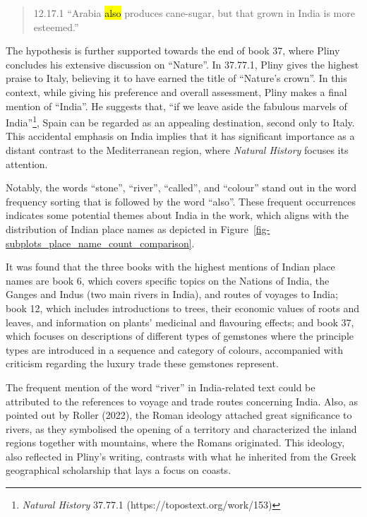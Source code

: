 \documentclass[
  12pt,
]{article}
\begin{document}
\begin{quote}
12.17.1 ``Arabia \hl{also} produces cane-sugar, but that grown in India
is more esteemed.''
\end{quote}

The hypothesis is further supported towards the end of book 37, where
Pliny concludes his extensive discussion on ``Nature''. In 37.77.1,
Pliny gives the highest praise to Italy, believing it to have earned the
title of ``Nature's crown''. In this context, while giving his
preference and overall assessment, Pliny makes a final mention of
``India''. He suggests that, ``if we leave aside the fabulous marvels of
India''\footnote{\emph{Natural History} 37.77.1
  (https://topostext.org/work/153)}, Spain can be regarded as an
appealing destination, second only to Italy. This accidental emphasis on
India implies that it has significant importance as a distant contrast
to the Mediterranean region, where \emph{Natural History} focuses its
attention.

Notably, the words ``stone'', ``river'', ``called'', and ``colour''
stand out in the word frequency sorting that is followed by the word
``also''. These frequent occurrences indicates some potential themes
about India in the work, which aligns with the distribution of Indian
place names as depicted in
Figure~\ref{fig-subplots_place_name_count_comparison}.

It was found that the three books with the highest mentions of Indian
place names are book 6, which covers specific topics on the Nations of
India, the Ganges and Indus (two main rivers in India), and routes of
voyages to India; book 12, which includes introductions to trees, their
economic values of roots and leaves, and information on plants'
medicinal and flavouring effects; and book 37, which focuses on
descriptions of different types of gemstones where the principle types
are introduced in a sequence and category of colours, accompanied with
criticism regarding the luxury trade these gemstones represent.

The frequent mention of the word ``river'' in India-related text could
be attributed to the references to voyage and trade routes concerning
India. Also, as pointed out by Roller (2022), the Roman ideology
attached great significance to rivers, as they symbolised the opening of
a territory and characterized the inland regions together with
mountains, where the Romans originated. This ideology, also reflected in
Pliny's writing, contrasts with what he inherited from the Greek
geographical scholarship that lays a focus on coasts.
\end{document}
